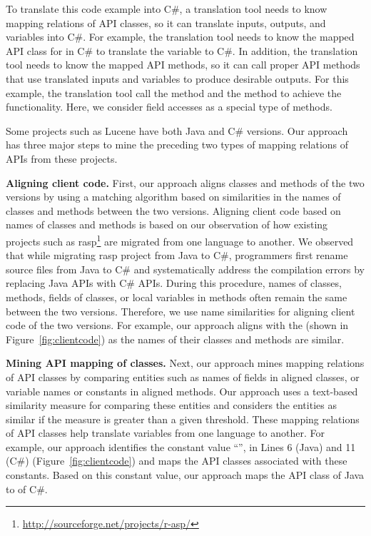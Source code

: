 To translate this code example into C\#, a translation tool needs to
know mapping relations of API classes, so it can translate inputs,
outputs, and variables into C\#. For example, the translation tool
needs to know the mapped API class for  in C\#
to translate the variable  to C\#. In addition, the
translation tool needs to know the mapped API methods, so it can
call proper API methods that use translated inputs and variables to
produce desirable outputs. For this example, the translation tool
call the  method and the  method to
achieve the functionality. Here, we consider field accesses as a
special type of methods.

Some projects such as Lucene have both Java and C\# versions. Our
approach has three major steps to mine the preceding two types of
mapping relations of APIs from these projects.

\textbf{Aligning client code.} First, our approach aligns classes
and methods of the two versions by using a matching algorithm based
on similarities in the names of classes and methods between the two
versions. Aligning client code based on names of classes and methods
is based on our observation of how existing projects such as
rasp\footnote{\url{http://sourceforge.net/projects/r-asp/}} are
migrated from one language to another. We observed that while
migrating rasp project from Java to C\#, programmers first rename
source files from Java to C\# and systematically address the
compilation errors by replacing Java APIs with C\# APIs. During this
procedure, names of classes, methods, fields of classes, or local
variables in methods often remain the same between the two versions.
Therefore, we use name similarities for aligning client code of the
two versions. For example, our approach aligns
 with the  (shown in
Figure~\ref{fig:clientcode}) as the names of their classes and
methods are similar.

\textbf{Mining API mapping of classes.} Next, our approach
mines mapping relations of API classes by comparing entities such as
names of fields in aligned classes, or variable names or constants
in aligned methods. Our approach uses a text-based similarity
measure for comparing these entities and considers the entities as
similar if the measure is greater than a given threshold. These
mapping relations of API classes help translate variables from one
language to another. For example, our approach identifies the
constant value ``'', in Lines 6 (Java) and 11 (C\#)
(Figure~\ref{fig:clientcode}) and maps the API classes associated
with these constants. Based on this constant value, our approach maps
the API class  of Java to
 of C\#.

